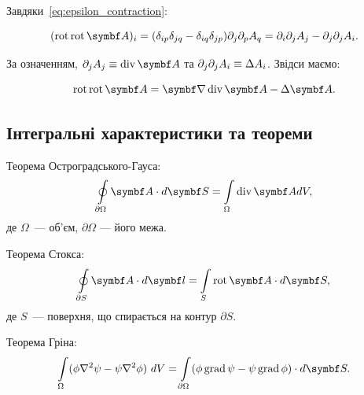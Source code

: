 Завдяки~\eqref{eq:epsilon_contraction}:

\begin{equation*}
(\Rot \Rot \vect{A})_i = (\delta_{ip} \delta_{jq} - \delta_{iq} \delta_{jp}) \partial_j \partial_p A_q = \partial_i \partial_j A_j - \partial_j
\partial_j A_i.
\end{equation*}

За означенням, \(\partial_j A_j \equiv \Div \vect{A}\) та \(\partial_j \partial_j A_i \equiv \Delta A_i\). Звідси маємо:

\begin{equation*}
\Rot \Rot \vect{A} = \grad \Div \vect{A} - \Laplasian \vect{A}.
\end{equation*}

\subsection{Інтегральні характеристики та теореми}

Теорема Ос\-тро\-град\-сько\-го-Гауса:
\begin{equation}\label{OGTheorem}
	\oint\limits_{\partial \Omega} \vect{A}\cdot d\vect{S} = \int\limits_{\Omega} \Div\vect{A} dV,
\end{equation}
де $\Omega$~--- об'єм, $\partial\Omega$ --- його межа.

Теорема Стокса:
\begin{equation}\label{Stoksheorem}
	\oint\limits_{\partial S} \vect{A}\cdot d\vect{l} = \int\limits_S \Rot\vect{A} \cdot d\vect{S},
\end{equation}
де $S$~--- поверхня, що спирається на контур $\partial S$.

Теорема Гріна:
\begin{equation}\label{Grin}
	\int\limits_{\Omega}(\phi \nabla ^{2}\psi -\psi \nabla ^{2}\phi )\ dV=\int \limits_{\partial \Omega}(\phi \Grad \psi -\psi \Grad\phi )\cdot d\vect{S}.
\end{equation}
